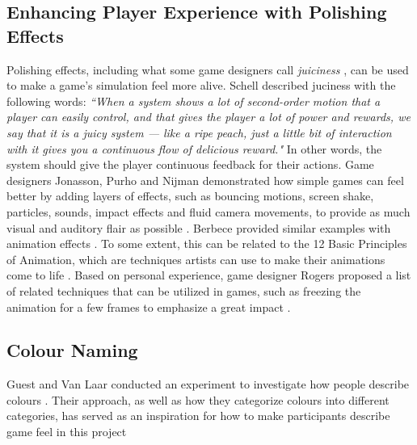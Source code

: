 \subsection{Enhancing Player Experience with Polishing Effects} \label{polishSection}
Polishing effects, including what some game designers call \textit{juiciness} \cite{juice3}, can be used to make a game's simulation feel more alive. Schell described juciness with the following words: \textit{``When a system shows a lot of second-order motion that a player can easily control, and that gives the player a lot of power and rewards, we say that it is a juicy system --- like a ripe peach, just a little bit of interaction with it gives you a continuous flow of delicious reward."} \cite{schell_art_2008} In other words, the system should give the player continuous feedback for their actions. Game designers Jonasson, Purho and Nijman demonstrated how simple games can feel better by adding layers of effects, such as bouncing motions, screen shake, particles, sounds, impact effects and fluid camera movements, to provide as much visual and auditory flair as possible \cite{juice1, juice2}. Berbece provided similar examples with animation effects \cite{animationSucks}. To some extent, this can be related to the 12 Basic Principles of Animation, which are techniques artists can use to make their animations come to life \cite{animation}. Based on personal experience, game designer Rogers proposed a list of related techniques that can be utilized in games, such as freezing the animation for a few frames to emphasize a great impact \cite{sticky}.


\subsection{Colour Naming} \label{colour}
Guest and Van Laar conducted an experiment to investigate how people describe colours \cite{guest_structure_2000}. Their approach, as well as how they categorize colours into different categories, has served as an inspiration for how to make participants describe game feel in this project

